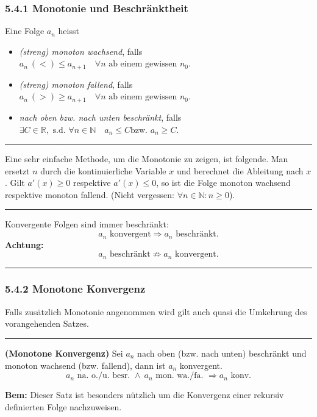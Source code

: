 \documentclass[a4paper,landscape,8pt]{extarticle}
\newcommand{\N}{\mathbb{N}}
\newcommand{\R}{\mathbb{R}}
\newcommand{\sep}{\vspace{5pt}\noindent\hrule\vspace{5pt}}
\newcommand{\Bem}{\textbf{Bem: }}
\newcommand{\Achtung}{\textbf{Achtung: }}
\begin{document}
\begin{multicols*}{4}
\subsubsection{5.4.1 Monotonie und Beschränktheit}

\Def Eine Folge $a_n$ heisst
\begin{itemize}
  \item \emph{(streng) monoton wachsend}, falls \\ $a_n \ (<) \leq a_{n+1} \quad
  \forall n \text{ ab einem gewissen } n_0.$
  \item \emph{(streng) monoton fallend}, falls \\ $a_n \ (>) \geq a_{n+1} \quad
  \forall n \text{ ab einem gewissen } n_0.$
  \item \emph{nach oben bzw. nach unten beschränkt}, falls\\
  $\exists C \in \R, \text{ s.d. } \forall n \in \N \quad a_n \leq C \text{
  bzw. } a_n \geq C.$
\end{itemize}

\sep

\Trick Eine sehr einfache Methode, um die Monotonie zu zeigen, ist folgende. Man
ersetzt $n$ durch die kontinuierliche Variable $x$ und berechnet die Ableitung
nach $x$. Gilt $a'(x)\geq 0$ respektive $a'(x)\leq 0$, so ist die Folge monoton
wachsend respektive monoton fallend. (Nicht vergessen: $\forall n\in\N : n
\geq 0$).

\sep

\Satz Konvergente Folgen sind immer beschränkt:
\[
a_n \text{ konvergent} \Longrightarrow a_n \text{ beschränkt}.
\]
\Achtung
\[
a_n \text{ beschränkt} \not\Longrightarrow a_n \text{ konvergent}.
\]

\sep

\subsubsection{5.4.2 Monotone Konvergenz}

Falls zusätzlich Monotonie angenommen wird gilt auch quasi die Umkehrung des
vorangehenden Satzes.

\sep

\Satz \textbf{(Monotone Konvergenz)} Sei $a_n$ nach oben (bzw. nach unten)
beschränkt und monoton wachsend (bzw. fallend), dann ist $a_n$ konvergent.
\[
a_n \text{ na. o./u. besr. } \land \  a_n \text{ mon. wa./fa. }
\Longrightarrow a_n \text{ konv.}
\]

\Bem Dieser Satz ist besonders nützlich um die Konvergenz einer rekursiv
definierten Folge nachzuweisen.


\end{multicols*}
\end{document}
